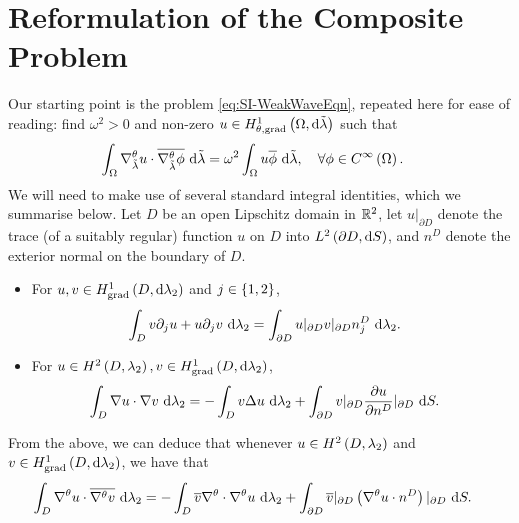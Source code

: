 \section{Reformulation of the Composite Problem} \label{sec:SI-Derivation}

Our starting point is the problem \eqref{eq:SI-WeakWaveEqn}, repeated here for ease of reading: find $\omega^2>0$ and non-zero $u\in H^1_{\theta, \mathrm{grad}}\left( \Omega, \mathrm{d}\tilde{\lambda} \right)$ such that
\begin{align*}
	\int_{\Omega} \nabla^{\theta}_{\tilde{\lambda}}u\cdot\overline{\nabla^{\theta}_{\tilde{\lambda}}\phi}  \ \mathrm{d}\tilde{\lambda}
	&= \omega^2 \int_{\Omega} u\overline{\phi}  \ \mathrm{d}\tilde{\lambda}, \quad\forall\phi\in C^{\infty}\left( \Omega \right).
\end{align*}
We will need to make use of several standard integral identities, which we summarise below.
Let $D$ be an open Lipschitz domain in $\mathbb{R}^2$, let $u\vert_{\partial D}$ denote the trace (of a suitably regular) function $u$ on $D$ into $L^{2}\left( \partial D,\mathrm{d}S \right)$, and $n^D$ denote the exterior normal on the boundary of $D$.
\begin{itemize}
	\item For $u,v\in H^1_\mathrm{grad}\left( D, \mathrm{d}\lambda_2 \right)$ and $j\in\left\{ 1,2 \right\}$,
	\begin{align*}
		\int_{D} v\partial_j u + u\partial_j v  \ \mathrm{d}\lambda_2
		&= \int_{\partial D} u\vert_{\partial D}v\vert_{\partial D}n^D_j  \ \mathrm{d}\lambda_2.
	\end{align*}
	\item For $u\in H^2\left( D,\lambda_2 \right), v\in H^1_\mathrm{grad}\left( D, \mathrm{d}\lambda_2 \right)$,
	\begin{align*}
		\int_{D} \nabla u\cdot \nabla v  \ \mathrm{d}\lambda_2 
		&=  - \int_{D} v\Delta u  \ \mathrm{d}\lambda_2 + \int_{\partial D} v\vert_{\partial D}\dfrac{\partial u}{\partial n^D}\vert_{\partial D}  \ \mathrm{d}S.
	\end{align*}
\end{itemize}
From the above, we can deduce that whenever $u\in H^2\left( D,\lambda_2 \right)$ and $v\in H^1_\mathrm{grad}\left( D, \mathrm{d}\lambda_2 \right)$, we have that
\begin{align*}
	\int_{D} \nabla^{\theta} u\cdot\overline{\nabla^{\theta} v}  \ \mathrm{d}\lambda_2
	&= - \int_{D} \overline{v}\nabla^{\theta}\cdot\nabla^{\theta} u  \ \mathrm{d}\lambda_2 + \int_{\partial D} \overline{v}\vert_{\partial D}\left( \nabla^{\theta} u\cdot n^D \right)\vert_{\partial D}  \ \mathrm{d}S.
\end{align*}

